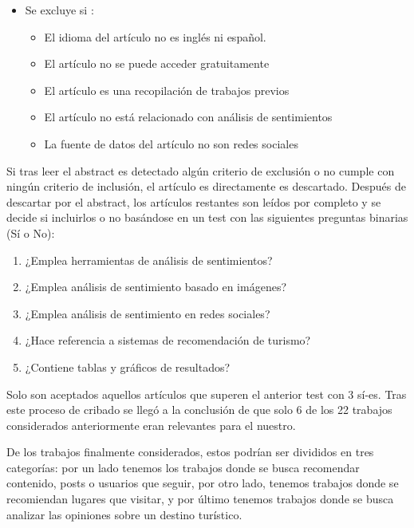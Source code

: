 \begin{enumerate}
\begin{itemize}
        \item Se excluye si :
        \begin{itemize}
            \item El idioma del artículo no es inglés ni español.
            \item El artículo no se puede acceder gratuitamente
            \item El artículo es una recopilación de trabajos previos
            \item El artículo no está relacionado con análisis de sentimientos
            \item La fuente de datos del artículo no son redes sociales
        \end{itemize}
    \end{itemize}

    Si tras leer el abstract es detectado algún criterio de exclusión o no cumple con ningún criterio de inclusión, el artículo es directamente es descartado. Después de descartar por el abstract, los artículos restantes son leídos por completo y se decide si incluirlos o no basándose en un test con las siguientes preguntas binarias (Sí o No):

    \begin{enumerate}
        \item ¿Emplea herramientas de análisis de sentimientos?
        \item ¿Emplea análisis de sentimiento basado en imágenes?
        \item ¿Emplea análisis de sentimiento en redes sociales?
        \item ¿Hace referencia a sistemas de recomendación de turismo?
        \item ¿Contiene tablas y gráficos de resultados?
    \end{enumerate}
    
    Solo son aceptados aquellos artículos que superen el anterior test con 3 sí-es. Tras este proceso de cribado se llegó a la conclusión de que solo 6 de los 22 trabajos considerados anteriormente eran relevantes para el nuestro.
\end{enumerate}

De los trabajos finalmente considerados, estos podrían ser divididos en tres categorías: por un lado tenemos los trabajos donde se busca recomendar contenido, posts o usuarios que seguir, por otro lado, tenemos trabajos donde se recomiendan lugares que visitar, y por último tenemos trabajos donde se busca analizar las opiniones sobre un destino turístico.

